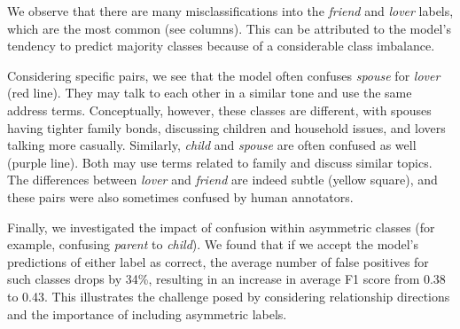 We observe that there are many misclassifications into the \emph{friend} and \emph{lover} labels, which are the most common (see columns).
This can be attributed to the model's tendency to predict majority classes because of a considerable class imbalance. 

Considering specific pairs, we see that the model often confuses \emph{spouse} for \emph{lover} (red line). They may talk to each other in a similar tone and use the same address terms. Conceptually, however, these classes are different, with spouses having tighter family bonds, discussing children and household issues, and lovers talking more casually.
Similarly, \emph{child} and \emph{spouse} are often confused as well (purple line). Both may use terms related to family and discuss similar topics. The differences between \emph{lover} and \emph{friend} are indeed subtle (yellow square), and these pairs were also sometimes confused by human annotators.

Finally, we investigated the impact of confusion within asymmetric classes (for example, confusing \emph{parent} to \emph{child}). We found that if we accept the model's predictions of either label as correct, the average number of false positives for such classes drops by 34\%, resulting in an increase in average F1 score from 0.38 to 0.43.
This illustrates the challenge posed by considering relationship directions and the importance of including asymmetric labels.

